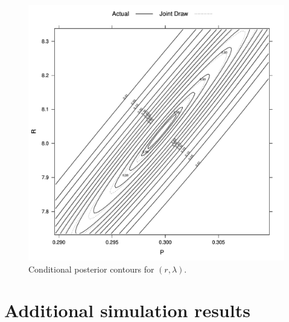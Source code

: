 \begin{figure}
\centering
\includegraphics[width=1\textwidth]{figures/proteomics/Neg_Bin_Parameter_Draw}
\caption{Conditional posterior contours for $(r, \lambda)$.\label{supp:proteomics:fig:Negative-binomial-parameters}}
\end{figure}



\clearpage

\section{Additional simulation results}

